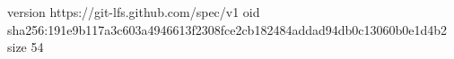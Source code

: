 version https://git-lfs.github.com/spec/v1
oid sha256:191e9b117a3c603a4946613f2308fce2cb182484addad94db0c13060b0e1d4b2
size 54
